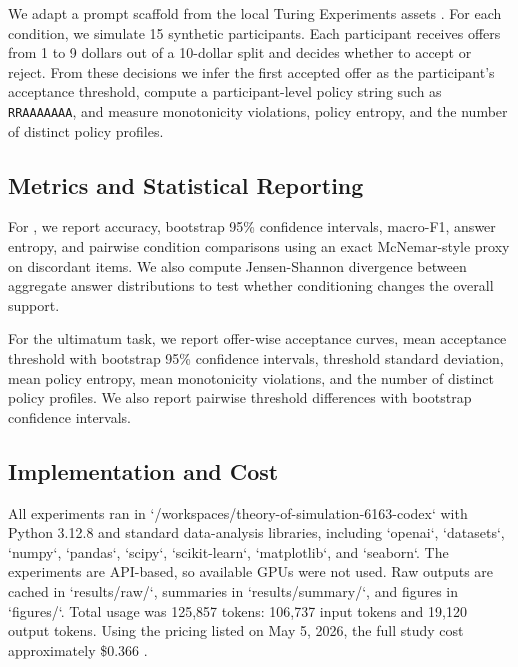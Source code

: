  We adapt a prompt scaffold from the local Turing Experiments assets \cite{aher2023using}. For each condition, we simulate 15 synthetic participants. Each participant receives offers from 1 to 9 dollars out of a 10-dollar split and decides whether to accept or reject. From these decisions we infer the first accepted offer as the participant's acceptance threshold, compute a participant-level policy string such as \texttt{RRAAAAAAA}, and measure monotonicity violations, policy entropy, and the number of distinct policy profiles.

\subsection{Metrics and Statistical Reporting}

For \socialiqa, we report accuracy, bootstrap 95\% confidence intervals, macro-F1, answer entropy, and pairwise condition comparisons using an exact McNemar-style proxy on discordant items. We also compute Jensen-Shannon divergence between aggregate answer distributions to test whether conditioning changes the overall support.

For the ultimatum task, we report offer-wise acceptance curves, mean acceptance threshold with bootstrap 95\% confidence intervals, threshold standard deviation, mean policy entropy, mean monotonicity violations, and the number of distinct policy profiles. We also report pairwise threshold differences with bootstrap confidence intervals.

\subsection{Implementation and Cost}

All experiments ran in `/workspaces/theory-of-simulation-6163-codex` with Python 3.12.8 and standard data-analysis libraries, including `openai`, `datasets`, `numpy`, `pandas`, `scipy`, `scikit-learn`, `matplotlib`, and `seaborn`. The experiments are API-based, so available GPUs were not used. Raw outputs are cached in `results/raw/`, summaries in `results/summary/`, and figures in `figures/`. Total usage was 125{,}857 tokens: 106{,}737 input tokens and 19{,}120 output tokens. Using the \gptfourone pricing listed on May 5, 2026, the full study cost approximately \$0.366 \cite{openai2026pricing}.
